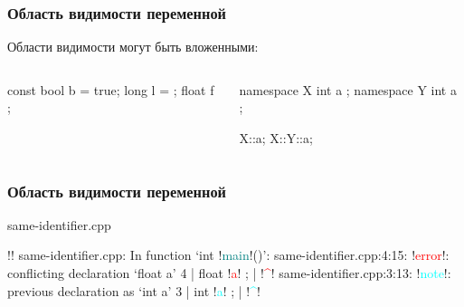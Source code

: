 \documentclass[compress, 8pt]{beamer}
\begin{document}
\begin{frame}[fragile]

    \frametitle{Область видимости переменной}

    Области видимости могут быть вложенными:

    \begin{columns}[T]

        \begin{column}{0.5\textwidth}

            \begin{myinplacelisting}[minted language=cpp]
{
    const bool b = true;
    {
        {
            long l = {};
        }
        float f {};
    }
}
            \end{myinplacelisting}

        \end{column}

        \begin{column}{0.5\textwidth}

            \begin{myinplacelisting}[minted language=cpp]
namespace X {
    int a {};
    namespace Y {
            int a {};
    }
}

X::a;
X::Y::a;
            \end{myinplacelisting}

        \end{column}

    \end{columns}

\end{frame}

\begin{frame}[fragile]

    \frametitle{Область видимости переменной}

        {same-identifier.cpp}

    \begin{terminalwindow}
!!
same-identifier.cpp: In function ‘int !\textcolor{teal}{main}!()’:
same-identifier.cpp:4:15: !\textcolor{red}{error}!: conflicting declaration ‘float a’
    4 |         float !\textcolor{red}{a}! {};
      |               !\textcolor{red}{\^{}}!
same-identifier.cpp:3:13: !\textcolor{cyan}{note}!: previous declaration as ‘int a’
    3 |         int !\textcolor{cyan}{a}! {};
      |             !\textcolor{cyan}{\^{}}!
    \end{terminalwindow}

\end{frame}
\end{document}
